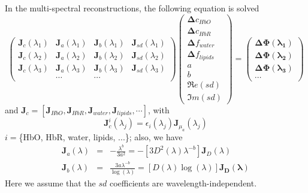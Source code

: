 \documentclass[12pt]{book}               %
\begin{document}
In the multi-spectral reconstructions, the following equation is solved
\begin{equation}\label{eq:multispectral}
\left(
\begin{array}{llll}
\mathbf{J}_{c}(\lambda_1) & \mathbf{J}_{a}(\lambda_1) & \mathbf{J}_b(\lambda_1) & \mathbf{J}_{sd}(\lambda_1)\\
\mathbf{J}_{c}(\lambda_2) & \mathbf{J}_{a}(\lambda_2) & \mathbf{J}_b(\lambda_2) & \mathbf{J}_{sd}(\lambda_2)\\
\mathbf{J}_{c}(\lambda_3) & \mathbf{J}_{a}(\lambda_3) & \mathbf{J}_b(\lambda_3) & \mathbf{J}_{sd}(\lambda_3)\\
 & \cdots & \cdots 
\end{array}\right)
\left(
\begin{array}{c}
\boldsymbol{\Delta}{c_{HbO}}\\
\boldsymbol{\Delta}{c_{HbR}}\\
\boldsymbol{\Delta}{f_{water}}\\
\boldsymbol{\Delta}{f_{lipids}}\\
a\\
b\\
\Re e({sd})\\
\Im m({sd})
\end{array}
\right)=\left(
\begin{array}{c}
\boldsymbol{\Delta\Phi(\lambda_1)}\\
\boldsymbol{\Delta\Phi(\lambda_2)}\\
\boldsymbol{\Delta\Phi(\lambda_3)}\\
\cdots
\end{array}\right)
\end{equation}
and $\mathbf{J}_{c}=\left[\mathbf{J}_{HbO}, \mathbf{J}_{HbR}, \mathbf{J}_{water}, \mathbf{J}_{lipids}, \cdots\right]$, with
\begin{equation}
\mathbf{J}_{c}^i(\lambda_j)=\epsilon_i(\lambda_j)\mathbf{J}_{\mu_a}(\lambda_j)
\end{equation}
$i=$\{HbO, HbR, water, lipids, ...\}; also, we have
\begin{eqnarray}
\mathbf{J}_a(\lambda)&=&-\frac{\lambda^{b}}{3a^2} = -\left[3D^2(\lambda)\lambda^{-b}\right]\mathbf{J}_D(\lambda)\\
\mathbf{J}_b(\lambda)&=& \frac{3a\lambda^{-b}}{\log(\lambda)} =\left[D(\lambda)\log(\lambda)\right]\mathbf{J_D(\lambda)}
\end{eqnarray}
Here we assume that the $sd$ coefficients are wavelength-independent.
\end{document}
